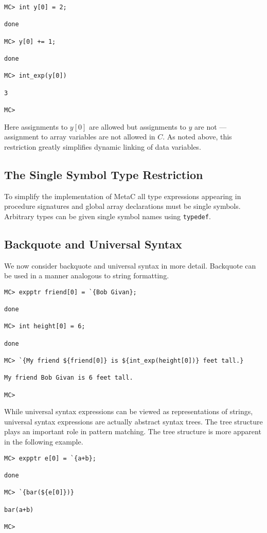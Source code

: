 \documentclass{article}
\begin{document}
\begin{verbatim}
MC> int y[0] = 2;

done

MC> y[0] += 1;

done

MC> int_exp(y[0])

3

MC>
\end{verbatim}

Here assignments to $y[0]$ are allowed but assignments to $y$ are not --- assignment to array variables
are not allowed in $C$. As noted above, this restriction greatly simplifies dynamic linking of data variables.

\subsection{The Single Symbol Type Restriction}

To simplify the implementation of MetaC all type expressions appearing in procedure signatures and global array declarations must be single symbols.
Arbitrary types can be given single symbol names using {\tt typedef}.

\subsection{Backquote and Universal Syntax}

We now consider backquote and universal syntax in more detail.  Backquote can be used in a manner analogous to string formatting.

\begin{verbatim}
MC> expptr friend[0] = `{Bob Givan};

done

MC> int height[0] = 6;

done

MC> `{My friend ${friend[0]} is ${int_exp(height[0])} feet tall.}

My friend Bob Givan is 6 feet tall.

MC> 
\end{verbatim}

While universal syntax expressions can be viewed as representations of strings, universal syntax
expressions are actually abstract syntax trees. The tree structure
plays an important role in pattern matching. The tree structure is
more apparent in the following example.

\begin{verbatim}
MC> expptr e[0] = `{a+b};

done

MC> `{bar(${e[0]})}

bar(a+b)

MC>
\end{verbatim}
\end{document}
